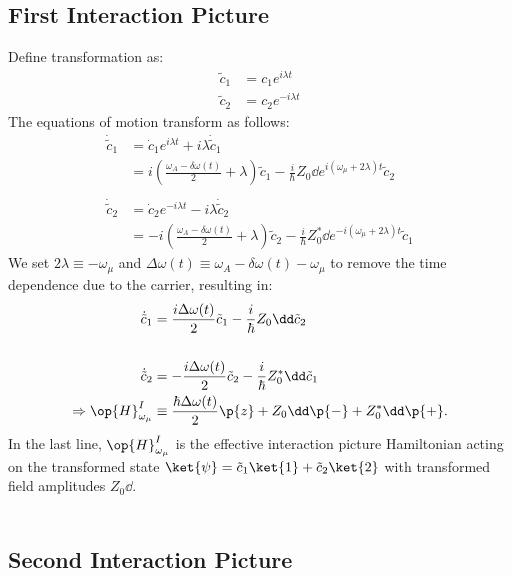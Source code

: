 \subsection{First Interaction Picture}

Define transformation as:
\begin{align}
\tilde{c}_1 &= c_1e^{i\lambda t} \\
\tilde{c}_2 &= c_2e^{-i\lambda t}
\end{align}
The equations of motion transform as follows:
\begin{align}
\dot{\tilde{c}}_1 & = \dot{c}_1 e^{i \lambda t} + i \lambda \dot{\tilde{c}}_1 \\
& =  i(\frac{\omega_A - \delta\omega(t)}{2} + \lambda)\tilde{c}_1 - \frac{i}{\hbar}Z_0\dd e^{i(\omega_\mu +2\lambda)t}\tilde{c}_2\\
& \nonumber \\
\dot{\tilde{c}}_2 & = \dot{c}_2 e^{-i \lambda t} - i \lambda \dot{\tilde{c}}_2 \\
& =  -i(\frac{\omega_A - \delta\omega(t)}{2} + \lambda)\tilde{c}_2- \frac{i}{\hbar}Z_0^*\dd e^{-i(\omega_\mu +2\lambda)t}\tilde{c}_1
\end{align}
We set $2\lambda \equiv -\omega_\mu$ and $\Delta \omega(t) \equiv \omega_A - \delta\omega(t) -\omega_\mu$ to remove the time dependence due to the carrier, resulting in:
\begin{align}
\dot{\tilde{c}}_1 & =  \frac{i\Delta \omega(t)}{2}\tilde{c}_1 - \frac{i}{\hbar}Z_0\dd \tilde{c}_2\\
& \nonumber \\
\dot{\tilde{c}}_2 & =  -\frac{i\Delta \omega(t) }{2}\tilde{c}_2- \frac{i}{\hbar}Z_0^*\dd \tilde{c}_1\\
 \Rightarrow \op{H}_{\omega_\mu}^{I} &\equiv \frac{\hbar \Delta \omega(t)}{2}\p{z} + Z_0\dd\p{-} + Z_0^*\dd\p{+}.
\end{align}
In the last line, $\op{H}_{\omega_\mu}^{I}$ is the effective interaction picture Hamiltonian acting on the transformed state $\ket{\psi} = \tilde{c}_1\ket{1} + \tilde{c}_2\ket{2}$ with transformed field amplitudes $Z_0\dd$.
\\
\\
\subsection{Second Interaction Picture}


